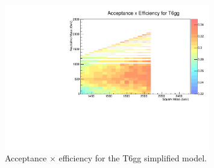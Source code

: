 \begin{figure}[h]
\begin{center}
\includegraphics[width=0.8\textwidth]{Figures/Results/accXeff_T6gg.pdf}
\end{center}
    \caption{Acceptance $\times$ efficiency for the T6gg simplified model.}
    \label{fig:limit_T6gg}
\end{figure}

